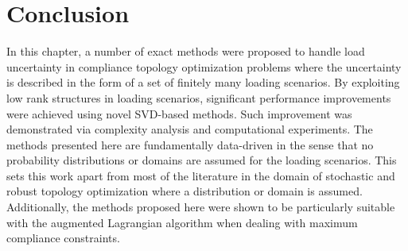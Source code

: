 \section{Conclusion} \label{sec:conclusion}

  In this chapter, a number of exact methods were proposed to handle load uncertainty in compliance topology optimization problems where the uncertainty is described in the form of a set of finitely many loading scenarios. By exploiting low rank structures in loading scenarios, significant performance improvements were achieved using novel SVD-based methods. Such improvement was demonstrated via complexity analysis and computational experiments. The methods presented here are fundamentally data-driven in the sense that no probability distributions or domains are assumed for the loading scenarios. This sets this work apart from most of the literature in the domain of stochastic and robust topology optimization where a distribution or domain is assumed. Additionally, the methods proposed here were shown to be particularly suitable with the augmented Lagrangian algorithm when dealing with maximum compliance constraints.

\newpage
